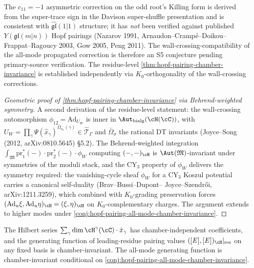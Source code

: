 \begin{remark}
 \label{rem:all-mode-conjectural}
 The $c_{11} = -1$ asymmetric correction on the odd root's Killing
 form is derived from the super-trace sign in the Davison super-shuffle
 presentation and is consistent with $\widehat{\mathfrak{gl}}(1|1)$
 structure; it has \emph{not} been verified against published
 $Y(\mathfrak{gl}(m|n))$ Hopf pairings (Nazarov 1991,
 Arnaudon--Cramp\'e--Doikou--Frappat--Ragoucy 2003, Gow 2005, Peng 2011).
 The wall-crossing-compatibility of the all-mode propagated correction
 is therefore an S5 conjecture pending primary-source verification.
 The residue-level \cref{thm:hopf-pairing-chamber-invariance} is
 established independently via $K_0$-orthogonality of the
 wall-crossing corrections.
\end{remark}

\begin{proof}[Geometric proof of \cref{thm:hopf-pairing-chamber-invariance} via Behrend-weighted symmetry]
 A second derivation of the residue-level statement: the wall-crossing
 automorphism $\phi_{12} = \mathrm{Ad}_{U_W}$ is inner in
 $\Aut_{\mathrm{bialg}}(\cH(\cC))$, with
 $U_W = \prod_\gamma \Psi(\hat{x}_\gamma)^{\bar{\Omega}_{\sigma_1}(\gamma)}
 \in \hat{\mathcal{T}}_\Gamma$ and $\bar{\Omega}_\sigma$ the rational DT
 invariants (Joyce--Song (2012, arXiv:0810.5645) \S 5.2). The
 Behrend-weighted integration
 $\int_{\mathfrak{M}} \mathrm{pr}_1^*(-) \cdot \mathrm{pr}_2^*(-) \cdot \phi_W$
 computing $(-, -)_\cH$ is $\Aut(\mathfrak{M})$-invariant under symmetries
 of the moduli stack, and the CY$_3$ property of $\phi_W$ delivers the
 symmetry required: the vanishing-cycle sheaf $\phi_W$ for a CY$_3$
 Koszul potential carries a canonical self-duality (Brav--Bussi--Dupont--
 Joyce--Szendr\H{o}i, arXiv:1211.3259), which combined with $K_0$-grading
 preservation forces $(\mathrm{Ad}_u \xi, \mathrm{Ad}_u \eta)_\cH
 = (\xi, \eta)_\cH$ on $K_0$-complementary charges. The argument extends
 to higher modes under
 \cref{conj:hopf-pairing-all-mode-chamber-invariance}.
\end{proof}

\begin{corollary}
 \label{cor:hilbert-series-chamber-indep}
 The Hilbert series $\sum_\gamma \dim \cH^\gamma(\cC) \cdot \hat{x}_\gamma$
 has chamber-independent coefficients, and the generating function of
 leading-residue pairing values $([E], [E])_\cH|_{\mathrm{res}}$ on any
 fixed basis is chamber-invariant. The all-mode generating function is
 chamber-invariant conditional on
 \cref{conj:hopf-pairing-all-mode-chamber-invariance}.
\end{corollary}

